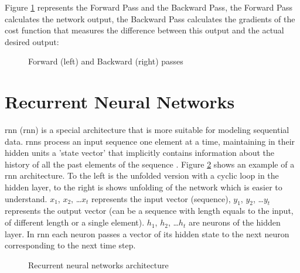 Figure \ref{fig:forward-backward-pass} represents the Forward Pass and the Backward Pass, the Forward Pass calculates the network output, the Backward Pass calculates the gradients of the cost function that measures the difference between this output and the actual desired output:

\begin{figure}[h]
    \centering
	
    \caption{Forward (left) and Backward (right) passes}
    \label{fig:forward-backward-pass}
\end{figure}

\section{Recurrent Neural Networks}
\acrlong{rnn} (\acrshort{rnn}) is a special architecture that is more suitable for modeling sequential data. \acrshort{rnn}s process an input sequence one element at a time, maintaining in their hidden units a 'state vector' that implicitly contains information about the history of all the past elements of the sequence \cite{LeCun2015}. Figure \ref{fig:rnn} shows an example of a \acrshort{rnn} architecture. To the left is the unfolded version with a cyclic loop in the hidden layer, to the right is shows unfolding of the network which is easier to understand. $x_1$, $x_2$, …$x_t$ represents the input vector (sequence), $y_1$, $y_2$, …$y_t$ represents the output vector (can be a sequence with length equals to the input, of different length or a single element). $h_1$, $h_2$, …$h_t$ are neurons of the hidden layer. In \acrshort{rnn} each neuron passes a vector of its hidden state to the next neuron corresponding to the next time step.
    
\begin{figure}[H]
        \centering
        
        \caption{Recurrent neural networks architecture}
        \label{fig:rnn}
\end{figure}

